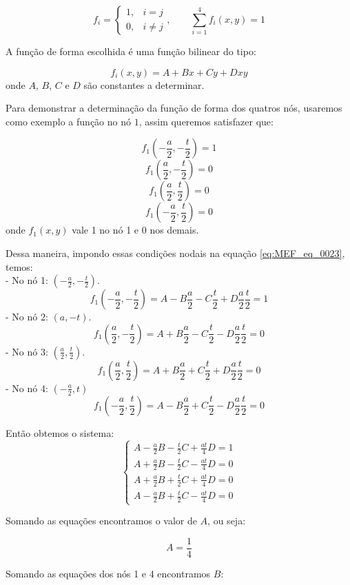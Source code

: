 \documentclass[
12pt,
a4paper,
oneside,
chapter=TITLE,
sumario=tradicional
]{abntex2}
\begin{document}
\begin{equation}
	f_i =
	\begin{cases}
		1, & i = j \\
		0, & i \neq j
	\end{cases},
	\qquad
	\sum_{i=1}^{4} f_i(x,y) = 1
	\label{eq:MEF_eq_0022} 
\end{equation}

A função de forma escolhida é uma função bilinear do tipo: 

\begin{equation}
	f_i(x,y)=A+Bx+Cy+Dxy
	\label{eq:MEF_eq_0023}  
\end{equation}
onde $A$, $B$, $C$ e $D$ são constantes a determinar.

Para demonstrar a determinação da função de forma dos quatros nós, usaremos como exemplo a função no nó $1$, assim queremos satisfazer que: 


$$f_1(-\frac{a}{2}, -\frac{t}{2})=1$$
$$f_1(\frac{a}{2}, -\frac{t}{2})=0$$
$$f_1(\frac{a}{2}, \frac{t}{2})=0$$
$$f_1(-\frac{a}{2}, \frac{t}{2})=0$$
onde $f_1(x,y)$ vale 1 no nó 1 e 0 nos demais.


Dessa maneira, impondo essas condições nodais na equação \ref{eq:MEF_eq_0023}, temos:\\
- No nó 1: $(-\frac{a}{2}, -\frac{t}{2})$.
$$  
f_1(-\frac{a}{2}, -\frac{t}{2})=A-B\frac{a}{2}-C\frac{t}{2}+D\frac{a}{2}\frac{t}{2}=1  
$$
- No nó 2: $(a,-t)$.
$$  
f_1(\frac{a}{2},-\frac{t}{2})=A+B\frac{a}{2}-C\frac{t}{2}-D\frac{a}{2} \frac{t}{2}=0  
$$
- No nó 3: $(\frac{a}{2},\frac{t}{2})$.
$$  
f_1(\frac{a}{2},\frac{t}{2})=A+B\frac{a}{2}+C\frac{t}{2}+D\frac{a}{2}\frac{t}{2}=0  
$$
- No nó 4: $(-\frac{a}{2},t)$
$$  
f_1(-\frac{a}{2},\frac{t}{2})=A-B\frac{a}{2}+C\frac{t}{2}-D\frac{a}{2}\frac{t}{2}=0  
$$

Então obtemos o sistema:
$$
\begin{cases}
	A - \frac{a}{2}B - \frac{t}{2}C + \frac{at}{4}D = 1 \\
	A + \frac{a}{2}B - \frac{t}{2}C - \frac{at}{4}D = 0 \\
	A + \frac{a}{2}B + \frac{t}{2}C + \frac{at}{4}D = 0 \\
	A - \frac{a}{2}B + \frac{t}{2}C - \frac{at}{4}D = 0
\end{cases}
$$

Somando as equações encontramos o valor de $A$, ou seja:

$$A = \frac{1}{4}$$


Somando as equações dos nós 1 e 4  encontramos $B$:
\end{document}
